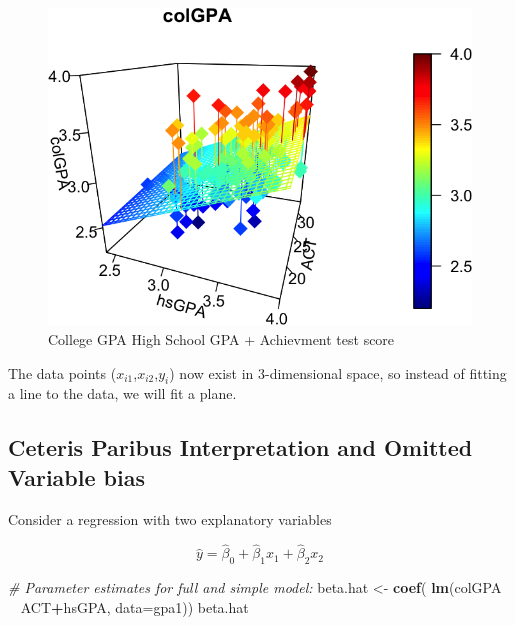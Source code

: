 \documentclass[]{book}
\newenvironment{Shaded}{\begin{snugshade}}{\end{snugshade}}
\newcommand{\CommentTok}[1]{\textcolor[rgb]{0.56,0.35,0.01}{\textit{#1}}}
\newcommand{\DataTypeTok}[1]{\textcolor[rgb]{0.13,0.29,0.53}{#1}}
\newcommand{\KeywordTok}[1]{\textcolor[rgb]{0.13,0.29,0.53}{\textbf{#1}}}
\newcommand{\NormalTok}[1]{#1}
\newcommand{\OperatorTok}[1]{\textcolor[rgb]{0.81,0.36,0.00}{\textbf{#1}}}
\newcommand{\StringTok}[1]{\textcolor[rgb]{0.31,0.60,0.02}{#1}}
\begin{document}
\begin{figure}

{\centering \includegraphics[width=0.8\linewidth]{MEM5220_R_files/figure-latex/fig16-1} 

}

\caption{College GPA  High School GPA + Achievment test score}\label{fig:fig16}
\end{figure}

The data points (\(x_{i1}\),\(x_{i2}\),\(y_{i}\)) now exist in
3-dimensional space, so instead of fitting a line to the data, we will
fit a plane.

\hypertarget{ceteris-paribus-interpretation-and-omitted-variable-bias}{%
\subsection{Ceteris Paribus Interpretation and Omitted Variable
bias}\label{ceteris-paribus-interpretation-and-omitted-variable-bias}}

Consider a regression with two explanatory variables

\begin{equation}
\hat{y} = \hat{\beta}_{0} + \hat{\beta}_{1}x_{1} +  \hat{\beta}_{2}x_{2}    
\label{eq:lmtwoexplanatory}
\end{equation}

\begin{Shaded}
\begin{Highlighting}[]
\CommentTok{# Parameter estimates for full and simple model:}
\NormalTok{beta.hat <-}\StringTok{ }\KeywordTok{coef}\NormalTok{( }\KeywordTok{lm}\NormalTok{(colGPA }\OperatorTok{~}\StringTok{ }\NormalTok{ACT}\OperatorTok{+}\NormalTok{hsGPA, }\DataTypeTok{data=}\NormalTok{gpa1))}
\NormalTok{beta.hat}
\end{Highlighting}
\end{Shaded}
\end{document}
